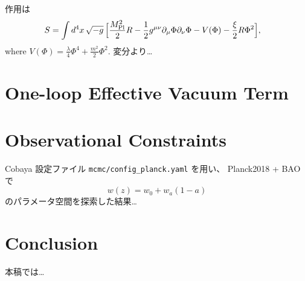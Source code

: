 \documentclass[11pt,a4paper]{article}
\newcommand{\Mpl}{M_{\mathrm{Pl}}}   %
\begin{document}
作用は
\begin{align}
  S &= \int d^4x \,\sqrt{-g}\,\Bigl[
        \frac{\Mpl^{2}}{2} R
      - \frac12 g^{\mu\nu}\partial_\mu \Phi \partial_\nu \Phi
      - V(\Phi)
      - \frac{\xi}{2} R \Phi^2
    \Bigr], \label{eq:action}
\end{align}
where $V(\Phi)=\frac{\lambda}{4}\Phi^4 + \frac{m^2}{2}\Phi^2$.
変分より…

\section{One-loop Effective Vacuum Term}
\label{sec:loop}

\section{Observational Constraints}
\label{sec:mcmc}

Cobaya 設定ファイル \texttt{mcmc/config\_planck.yaml} を用い、
Planck2018 + BAO で
\[
  w(z) = w_0 + w_a (1-a)
\]
のパラメータ空間を探索した結果…

\section{Conclusion}
本稿では…


% 
\end{document}
